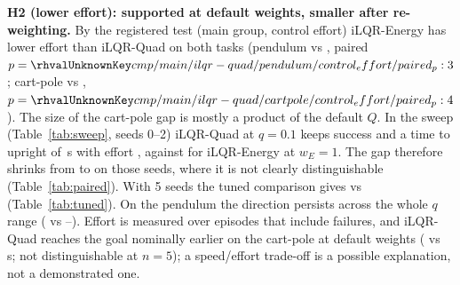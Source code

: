 \textbf{H2 (lower effort): supported at default weights, smaller after re-weighting.} By the registered test (main group, control effort) iLQR-Energy has lower effort than iLQR-Quad on both tasks (pendulum  vs , paired $p=\rhval{cmp/main/ilqr-quad/pendulum/control_effort/paired_p:3}$; cart-pole  vs , $p=\rhval{cmp/main/ilqr-quad/cartpole/control_effort/paired_p:4}$). The size of the cart-pole gap is mostly a product of the default $Q$. In the sweep (Table~\ref{tab:sweep}, seeds 0--2) iLQR-Quad at $q=0.1$ keeps success  and a time to upright of \,s with effort , against  for iLQR-Energy at $w_E=1$. The gap therefore shrinks from  to  on those seeds, where it is not clearly distinguishable (Table~\ref{tab:paired}). With 5 seeds the tuned comparison gives  vs  (Table~\ref{tab:tuned}). On the pendulum the direction persists across the whole $q$ range ( vs --). Effort is measured over episodes that include failures, and iLQR-Quad reaches the goal nominally earlier on the cart-pole at default weights ( vs \,s; not distinguishable at $n=5$); a speed/effort trade-off is a possible explanation, not a demonstrated one.

